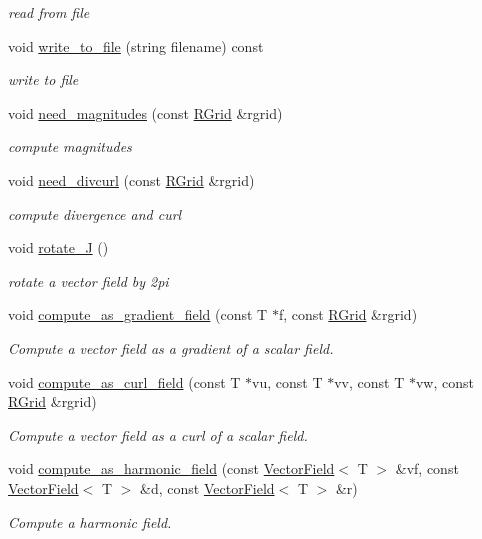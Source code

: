 \begin{DoxyCompactItemize}
\begin{DoxyCompactList}\small\item\em read from file \end{DoxyCompactList}\item 
void \hyperlink{class_vector_field_a019e01172088d8afab84281e49f175f4}{write\+\_\+to\+\_\+file} (string filename) const 
\begin{DoxyCompactList}\small\item\em write to file \end{DoxyCompactList}\item 
void \hyperlink{class_vector_field_adb5637ed5fe502b90ff814cb117a7cb6}{need\+\_\+magnitudes} (const \hyperlink{struct_r_grid}{R\+Grid} \&rgrid)
\begin{DoxyCompactList}\small\item\em compute magnitudes \end{DoxyCompactList}\item 
void \hyperlink{class_vector_field_a507f4d62289ea004846947543847564c}{need\+\_\+divcurl} (const \hyperlink{struct_r_grid}{R\+Grid} \&rgrid)
\begin{DoxyCompactList}\small\item\em compute divergence and curl \end{DoxyCompactList}\item 
void \hyperlink{class_vector_field_a28cf001aee5ee571d9b3a521a25694c6}{rotate\+\_\+\+J} ()
\begin{DoxyCompactList}\small\item\em rotate a vector field by 2pi \end{DoxyCompactList}\item 
void \hyperlink{class_vector_field_a10d6ceb8c89a5c401e207454899a1d2c}{compute\+\_\+as\+\_\+gradient\+\_\+field} (const T $\ast$f, const \hyperlink{struct_r_grid}{R\+Grid} \&rgrid)
\begin{DoxyCompactList}\small\item\em Compute a vector field as a gradient of a scalar field. \end{DoxyCompactList}\item 
void \hyperlink{class_vector_field_ac5ed12e73ad64f03317936af6940be2c}{compute\+\_\+as\+\_\+curl\+\_\+field} (const T $\ast$vu, const T $\ast$vv, const T $\ast$vw, const \hyperlink{struct_r_grid}{R\+Grid} \&rgrid)
\begin{DoxyCompactList}\small\item\em Compute a vector field as a curl of a scalar field. \end{DoxyCompactList}\item 
void \hyperlink{class_vector_field_ab9550f895ee09f5040072da6660cd44b}{compute\+\_\+as\+\_\+harmonic\+\_\+field} (const \hyperlink{class_vector_field}{Vector\+Field}$<$ T $>$ \&vf, const \hyperlink{class_vector_field}{Vector\+Field}$<$ T $>$ \&d, const \hyperlink{class_vector_field}{Vector\+Field}$<$ T $>$ \&r)
\begin{DoxyCompactList}\small\item\em Compute a harmonic field. \end{DoxyCompactList}\end{DoxyCompactItemize}
